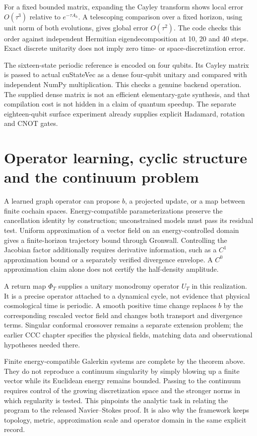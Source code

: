 For a fixed bounded matrix, expanding the Cayley transform shows local error $O(\tau^3)$ relative to $e^{-\tau A_h}$. A telescoping comparison over a fixed horizon, using unit norm of both evolutions, gives global error $O(\tau^2)$. The code checks this order against independent Hermitian eigendecomposition at 10, 20 and 40 steps. Exact discrete unitarity does not imply zero time- or space-discretization error.

The sixteen-state periodic reference is encoded on four qubits. Its Cayley matrix is passed to actual cuStateVec as a dense four-qubit unitary and compared with independent NumPy multiplication. This checks a genuine backend operation. The supplied dense matrix is not an efficient elementary-gate synthesis, and that compilation cost is not hidden in a claim of quantum speedup. The separate eighteen-qubit surface experiment already supplies explicit Hadamard, rotation and CNOT gates.

\section{Operator learning, cyclic structure and the continuum problem}

A learned graph operator can propose $b$, a projected update, or a map between finite cochain spaces. Energy-compatible parameterizations preserve the cancellation identity by construction; unconstrained models must pass its residual test. Uniform approximation of a vector field on an energy-controlled domain gives a finite-horizon trajectory bound through Gronwall. Controlling the Jacobian factor additionally requires derivative information, such as a $C^1$ approximation bound or a separately verified divergence envelope. A $C^0$ approximation claim alone does not certify the half-density amplitude.

A return map $\Phi_T$ supplies a unitary monodromy operator $U_T$ in this realization. It is a precise operator attached to a dynamical cycle, not evidence that physical cosmological time is periodic. A smooth positive time change replaces $b$ by the corresponding rescaled vector field and changes both transport and divergence terms. Singular conformal crossover remains a separate extension problem; the earlier CCC chapter specifies the physical fields, matching data and observational hypotheses needed there.

Finite energy-compatible Galerkin systems are complete by the theorem above. They do not reproduce a continuum singularity by simply blowing up a finite vector while its Euclidean energy remains bounded. Passing to the continuum requires control of the growing discretization space and the stronger norms in which regularity is tested. This pinpoints the analytic task in relating the program to the released Navier--Stokes proof. It is also why the framework keeps topology, metric, approximation scale and operator domain in the same explicit record.


